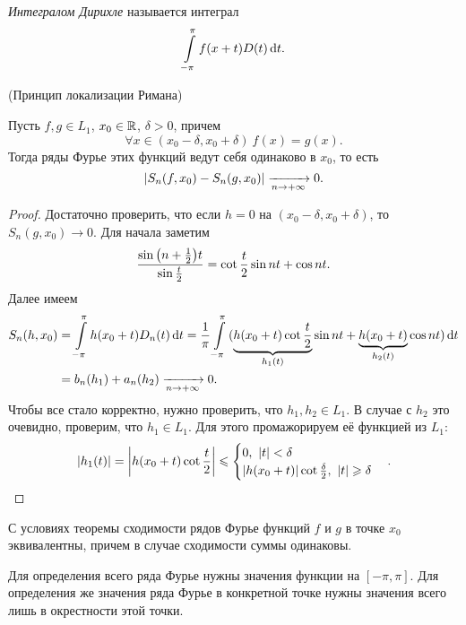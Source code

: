 \begin{definition}
    \textit{Интегралом Дирихле} называется интеграл
    \[
        \intl_{-\pi}^\pi{f(x + t) D(t) \dd t}
    .\]
\end{definition}

\begin{theorem}(Принцип локализации Римана)

    Пусть $f, g \in L_1$, $x_0 \in \R$, $\delta > 0$, причем
    \[
        \forall x \in (x_0 - \delta, x_0 + \delta)~ f(x) = g(x)
    .\]
    Тогда ряды Фурье этих функций ведут себя одинаково в $x_0$, то есть
    \[
        \abs*{S_n(f, x_0) - S_n(g, x_0)} \xrightarrow[n \to +\infty]{} 0
    .\]
\end{theorem}
\begin{proof}
    Достаточно проверить, что если $h = 0$ на $(x_0 - \delta, x_0 + \delta)$,
    то $S_n(g, x_0) \to 0$. Для начала заметим
    \[
        \frac{\sin{\parens*{n + \frac{1}{2}} t}}{\sin{\frac{t}{2}}} =
        \cot{\frac{t}{2}} \sin{nt} + \cos{nt}
    .\]
    Далее имеем
    \begin{align*}
        S_n(h, x_0) 
        &= \intl_{-\pi}^\pi{h(x_0 + t) D_n(t) \dd t} =
        \frac{1}{\pi} \intl_{-\pi}^\pi{(\underbrace{h(x_0 + t) \cot{\frac{t}{2}}}_{h_1(t)}
        \sin{nt} + \underbrace{h(x_0 + t)}_{h_2(t)} \cos{nt}) \dd t} \\ 
        &= b_n(h_1) + a_n(h_2) \xrightarrow[n \to +\infty]{} 0
    .\end{align*}
    Чтобы все стало корректно, нужно проверить, что $h_1, h_2 \in L_1$. В случае
    с $h_2$ это очевидно, проверим, что $h_1 \in L_1$. Для этого промажорируем
    её функцией из $L_1$:
    \[
        |h_1(t)| = \abs*{h(x_0 + t) \cot{\frac{t}{2}}} \leqslant \begin{cases}
            0,~ |t| < \delta \\
            |h(x_0 + t)| \cot{\frac{\delta}{2}},~ |t| \geqslant \delta
        \end{cases}
    .\]
\end{proof}

\begin{corollary}
    С условиях теоремы сходимости рядов Фурье функций $f$ и $g$ в точке $x_0$
    эквивалентны, причем в случае сходимости суммы одинаковы.
\end{corollary}

\begin{remark}
    Для определения всего ряда Фурье нужны значения функции на $[-\pi, \pi]$.
    Для определения же значения ряда Фурье в конкретной точке нужны значения
    всего лишь в окрестности этой точки.
\end{remark}

